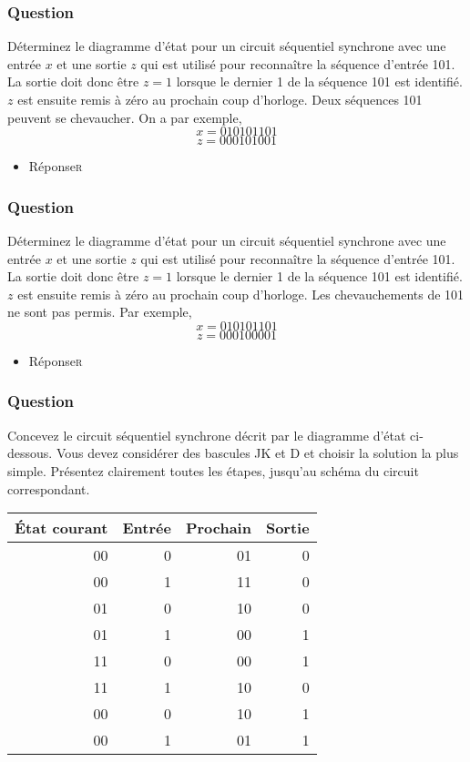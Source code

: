 \documentclass[11pt]{article}
\begin{document}
\subsubsection*{Question}
\label{sec:orgb08dfa9}
Déterminez le diagramme d'état pour un circuit séquentiel synchrone
  avec une entrée \(x\) et une sortie \(z\) qui est utilisé pour
  reconnaître la séquence d'entrée 101. La sortie doit donc être \(z=1\)
  lorsque le dernier 1 de la séquence 101 est identifié. \(z\) est
  ensuite remis à zéro au prochain coup d'horloge. Deux séquences 101
  peuvent se chevaucher. On a par exemple,
  $$
    x  =  010101101
    $$
  $$ z = 000101001
    $$

\begin{itemize}
\item Réponse\hfill{}\textsc{r}
\label{sec:org458ccb6}
\end{itemize}

\subsubsection*{Question}
\label{sec:orgac492f9}
Déterminez le diagramme d'état pour un circuit séquentiel synchrone
  avec une entrée \(x\) et une sortie \(z\) qui est utilisé pour
  reconnaître la séquence d'entrée 101. La sortie doit donc être \(z=1\)
  lorsque le dernier 1 de la séquence 101 est identifié. \(z\) est
  ensuite remis à zéro au prochain coup d'horloge. Les chevauchements de 101 ne sont pas 
  permis. Par exemple,
  $$
    x = 010101101
    $$
  $$
    z = 000100001
    $$

\begin{itemize}
\item Réponse\hfill{}\textsc{r}
\label{sec:org9931446}
\end{itemize}

\subsubsection*{Question}
\label{sec:org3a050ec}
Concevez le circuit séquentiel synchrone décrit par le diagramme
  d'état ci-dessous. Vous devez considérer des bascules JK et D et
  choisir la solution la plus simple. Présentez clairement toutes les
  étapes, jusqu'au schéma du circuit correspondant.
\begin{center}
\begin{tabular}{rrrr}
État courant & Entrée & Prochain & Sortie\\
\hline
00 & 0 & 01 & 0\\
00 & 1 & 11 & 0\\
01 & 0 & 10 & 0\\
01 & 1 & 00 & 1\\
11 & 0 & 00 & 1\\
11 & 1 & 10 & 0\\
00 & 0 & 10 & 1\\
00 & 1 & 01 & 1\\
\end{tabular}
\end{center}
\end{document}
